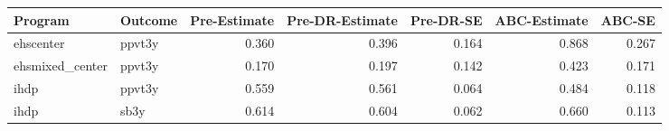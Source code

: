 \begin{table}[ht]
\centering
\begin{tabular}{llrrrrr}
  \hline
Program & Outcome & Pre-Estimate & Pre-DR-Estimate & Pre-DR-SE & ABC-Estimate & ABC-SE \\ 
  \hline
ehscenter & ppvt3y & 0.360 & 0.396 & 0.164 & 0.868 & 0.267 \\ 
  ehsmixed\_center & ppvt3y & 0.170 & 0.197 & 0.142 & 0.423 & 0.171 \\ 
  ihdp & ppvt3y & 0.559 & 0.561 & 0.064 & 0.484 & 0.118 \\ 
  ihdp & sb3y & 0.614 & 0.604 & 0.062 & 0.660 & 0.113 \\ 
   \hline
\end{tabular}
\end{table}
